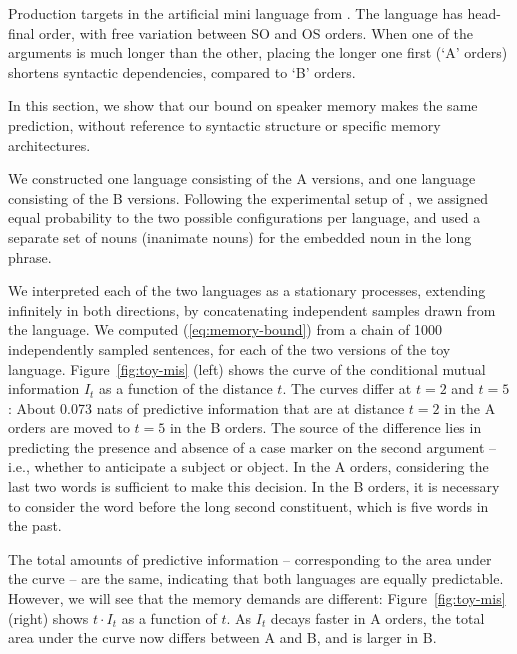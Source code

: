\begin{table}
			\caption{Production targets in the artificial mini language from \cite{fedzechkina-human-2017}. The language has head-final order, with free variation between SO and OS orders. When one of the arguments is much longer than the other, placing the longer one first (`A' orders) shortens syntactic dependencies, compared to `B' orders.}\label{tab:artificial}

\end{table}

In this section, we show that our bound on speaker memory makes the same prediction, without reference to syntactic structure or specific memory architectures. 

We constructed one language consisting of the A versions, and one language consisting of the B versions.
Following the experimental setup of \cite{fedzechkina-human-2017}, we assigned equal probability to the two possible configurations per language, and used a separate set of nouns (inanimate nouns) for the embedded noun in the long phrase.

We interpreted each of the two languages as a stationary processes, extending infinitely in both directions, by concatenating independent samples drawn from the language.
			We computed (\ref{eq:memory-bound}) from a chain of 1000 independently sampled sentences, for each of the two versions of the toy language.
			Figure~\ref{fig:toy-mis} (left) shows the curve of the conditional mutual information $I_t$ as a function of the distance $t$.
			The curves differ at $t=2$ and $t=5$: 
			About 0.073 nats of predictive information that are at distance $t=2$ in the A orders are moved to $t=5$ in the B orders.
			The source of the difference lies in predicting the presence and absence of a case marker on the second argument -- i.e., whether to anticipate a subject or object.
			In the A orders, considering the last two words is sufficient to make this decision.
			In the B orders, it is necessary to consider the word before the long second constituent, which is five words in the past.

			The total amounts of predictive information -- corresponding to the area under the curve -- are the same, indicating that both languages are equally predictable.
			However, we will see that the memory demands are different:
			Figure~\ref{fig:toy-mis} (right) shows $t\cdot I_t$ as a function of $t$.
			As $I_t$ decays faster in A orders, the total area under the curve now differs between A and B, and is larger in B.

